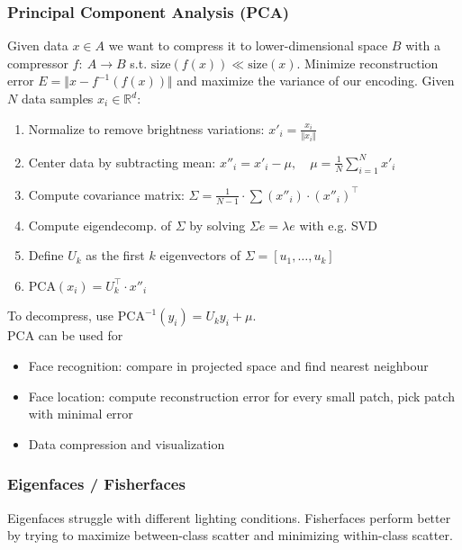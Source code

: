 \documentclass[a4paper,10pt]{article}
\begin{document}
\subsubsection{Principal Component Analysis (PCA)}
Given data \(x \in A\) we want to compress it to lower-dimensional space \(B\) with a compressor \(f: \: A \to B\) s.t. \(\text{size}(f(x)) \ll \text{size}(x)\). Minimize reconstruction error \(E = \Vert x - f^{-1}(f(x)) \Vert\) and maximize the variance of our encoding. Given \(N\) data samples \(x_i \in \mathbb{R}^d\):
\begin{enumerate}
    \item Normalize to remove brightness variations: \( x'_i = \frac{x_i}{\Vert x_i\Vert} \)
    \item Center data by subtracting mean: \( x''_i = x'_i - \mu, \quad \mu = \frac{1}{N}\sum_{i=1}^N x'_i  \)
    \item Compute covariance matrix: \( \Sigma = \frac{1}{N-1}\cdot \sum (x''_i)\cdot (x''_i)^\top \)
    \item Compute eigendecomp. of \( \Sigma \) by solving \( \Sigma e = \lambda e \) with e.g. SVD
    \item Define \( U_k \) as the first \( k \) eigenvectors of \( \Sigma = \left[u_{1}, \ldots, u_k\right] \)
    \item \( \text{PCA}(x_i) = U^\top_k \cdot x''_i \)
\end{enumerate}
To decompress, use \(\text{PCA}^{-1}(y_i) = U_k y_i + \mu\). \\
PCA can be used for
\begin{itemize}
    \item Face recognition: compare in projected space and find nearest neighbour
    \item Face location: compute reconstruction error for every small patch, pick patch with minimal error
    \item Data compression and visualization
\end{itemize}

\subsubsection{Eigenfaces / Fisherfaces}
Eigenfaces struggle with different lighting conditions. Fisherfaces perform better by trying to maximize between-class scatter and minimizing within-class scatter.
\end{document}
